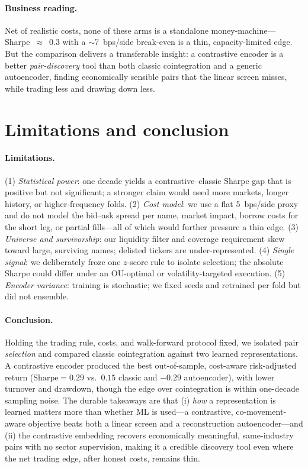 \documentclass[11pt]{article}
\begin{document}
\paragraph{Business reading.} Net of realistic costs, none of these arms is a
standalone money-machine---Sharpe~$\approx$~0.3 with a $\sim$7~bps/side break-even is a
thin, capacity-limited edge. But the comparison delivers a transferable insight: a
contrastive encoder is a better \emph{pair-discovery} tool than both classic
cointegration and a generic autoencoder, finding economically sensible pairs that the
linear screen misses, while trading less and drawing down less.

\section{Limitations and conclusion}
\paragraph{Limitations.} (1) \emph{Statistical power}: one decade yields a
contrastive--classic Sharpe gap that is positive but not significant; a stronger claim
would need more markets, longer history, or higher-frequency folds. (2) \emph{Cost
model}: we use a flat 5~bps/side proxy and do not model the bid--ask spread per name,
market impact, borrow costs for the short leg, or partial fills---all of which would
further pressure a thin edge. (3) \emph{Universe and survivorship}: our liquidity
filter and coverage requirement skew toward large, surviving names; delisted tickers
are under-represented. (4) \emph{Single signal}: we deliberately froze one $z$-score
rule to isolate selection; the absolute Sharpe could differ under an OU-optimal or
volatility-targeted execution. (5) \emph{Encoder variance}: training is stochastic; we
fixed seeds and retrained per fold but did not ensemble.

\paragraph{Conclusion.} Holding the trading rule, costs, and walk-forward protocol
fixed, we isolated pair \emph{selection} and compared classic cointegration against two
learned representations. A contrastive encoder produced the best out-of-sample,
cost-aware risk-adjusted return ($\text{Sharpe}=0.29$ vs.\ $0.15$ classic and $-0.29$
autoencoder), with lower turnover and drawdown, though the edge over cointegration is
within one-decade sampling noise. The durable takeaways are that (i) \emph{how} a
representation is learned matters more than whether ML is used---a contrastive,
co-movement-aware objective beats both a linear screen and a reconstruction
autoencoder---and (ii) the contrastive embedding recovers economically meaningful,
same-industry pairs with no sector supervision, making it a credible discovery tool
even where the net trading edge, after honest costs, remains thin.
\end{document}
